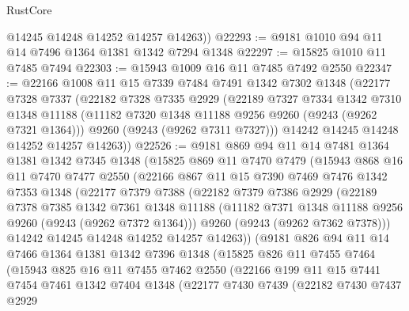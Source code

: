 \begin{lexlean}{RustCore}
\begin{coremodule}
        @14245
        @14248
        @14252
        @14257
        @14263))
@22293 := @9181 @1010 @94 @11 @14 @7496 @1364 @1381 @1342 @7294 @1348
@22297 := @15825 @1010 @11 @7485 @7494
@22303 := @15943 @1009 @16 @11 @7485 @7492 @2550
@22347 := @22166
    @1008
    @11
    @15
    @7339
    @7484
    @7491
    @1342
    @7302
    @1348
    (@22177
      @7328
      @7337
      (@22182
        @7328
        @7335
        @2929
        (@22189
          @7327
          @7334
          @1342
          @7310
          @1348
          @11188
          (@11182 @7320 @1348 @11188 @9256 @9260 (@9243 (@9262 @7321 @1364)))
          @9260
          (@9243 (@9262 @7311 @7327)))
        @14242
        @14245
        @14248
        @14252
        @14257
        @14263))
@22526 := @9181
    @869
    @94
    @11
    @14
    @7481
    @1364
    @1381
    @1342
    @7345
    @1348
    (@15825
      @869
      @11
      @7470
      @7479
      (@15943
        @868
        @16
        @11
        @7470
        @7477
        @2550
        (@22166
          @867
          @11
          @15
          @7390
          @7469
          @7476
          @1342
          @7353
          @1348
          (@22177
            @7379
            @7388
            (@22182
              @7379
              @7386
              @2929
              (@22189
                @7378
                @7385
                @1342
                @7361
                @1348
                @11188
                (@11182 @7371 @1348 @11188 @9256 @9260 (@9243 (@9262 @7372 @1364)))
                @9260
                (@9243 (@9262 @7362 @7378)))
              @14242
              @14245
              @14248
              @14252
              @14257
              @14263))
          (@9181
            @826
            @94
            @11
            @14
            @7466
            @1364
            @1381
            @1342
            @7396
            @1348
            (@15825
              @826
              @11
              @7455
              @7464
              (@15943
                @825
                @16
                @11
                @7455
                @7462
                @2550
                (@22166
                  @199
                  @11
                  @15
                  @7441
                  @7454
                  @7461
                  @1342
                  @7404
                  @1348
                  (@22177
                    @7430
                    @7439
                    (@22182
                      @7430
                      @7437
                      @2929

\end{coremodule}
\end{lexlean}
